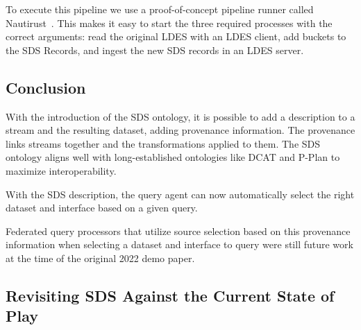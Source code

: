 To execute this pipeline we use a proof-of-concept pipeline runner called
Nautirust~\cite{Nautirust}. This makes it easy to start the three required
processes with the correct arguments: read the original LDES with an LDES
client, add buckets to the SDS Records, and ingest the new SDS records in an
LDES server.

\subsection{Conclusion}

With the introduction of the SDS ontology, it is possible to add a
description to a stream and the resulting dataset, adding provenance
information. The provenance links streams together and the transformations
applied to them. The SDS ontology aligns well with long-established
ontologies like DCAT and P-Plan to maximize interoperability.

With the SDS description, the query agent can now automatically select the
right dataset and interface based on a given query.

Federated query processors that utilize source selection based on this
provenance information when selecting a dataset and interface to query were
still future work at the time of the original 2022 demo paper.

\subsection{Revisiting SDS Against the Current State of Play}

